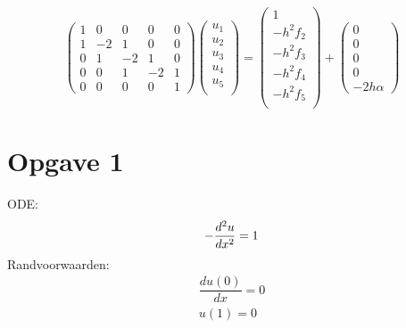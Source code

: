 \documentclass[11pt]{article}
\begin{document}
$$
\begin{pmatrix}
1 & 0 & 0 & 0 & 0 \\
1 & -2& 1 & 0 & 0 \\
0 & 1 & -2& 1 & 0 \\
0 & 0 & 1 & -2& 1 \\
0 & 0 & 0 & 0 & 1 
\end{pmatrix}
%
\begin{pmatrix}
u_{1}\\
u_{2}\\
u_{3}\\
u_{4}\\
u_{5}\\
\end{pmatrix}
=
\begin{pmatrix}
1\\
-h^2f_{2}\\
-h^2f_{3}\\
-h^2f_{4}\\
-h^2f_{5}\\
\end{pmatrix}
+
\begin{pmatrix}
0\\
0\\
0\\
0\\
-2h\alpha
\end{pmatrix}
$$

\newpage
\section{Opgave 1}
ODE:\\
$$
-\dfrac{d^2u}{dx^2} = 1\\\\
$$
Randvoorwaarden:\\
\begin{align*}
	\dfrac{du(0)}{dx} = 0 \\
				 u(1) = 0
\end{align*}
\end{document}
